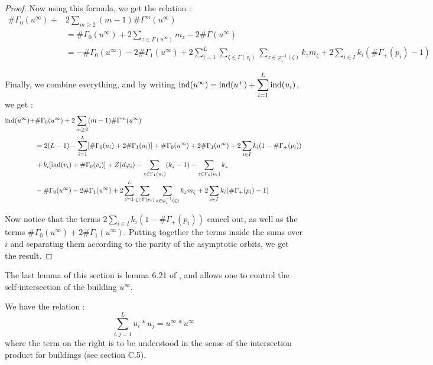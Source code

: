 \documentclass[../main.tex]{subfiles}
\begin{document}
\begin{proof}
Now using this formula, we get the relation : 
\begin{align*}
\#\Gamma_0(u^\infty) + &2\sum_{m\geq 2}(m-1)\#\Gamma^m(u^\infty) \\
&= \#\Gamma_0(u^\infty) + 2\sum_{z\in\Gamma(u^\infty)}m_z - 2\#\Gamma(u^\infty)\\
&=-\#\Gamma_0(u^\infty) - 2\#\Gamma_1(u^\infty) + 2\sum_{i = 1}^L\sum_{\zeta\in\Gamma(v_i)}\sum_{z\in\varphi_i^{-1}(\zeta)}k_z m_{\zeta} + 2\sum_{i \in I}k_i(\#\Gamma_+(p_i)-1)
\end{align*}

Finally, we combine everything, and by writing $\text{ind}(u^\infty) = \text{ind}(u^+) + \displaystyle\sum_{i = 1}^L\text{ind}(u_i)$, we get : 
\begin{align*}
\text{ind}(u^\infty) + &\#\Gamma_0(u^\infty) + 2\sum_{m\geq 2}(m-1)\#\Gamma^m(u^\infty)\\
&= 2(L-1) - \sum_{i = 1}^L[\#\Gamma_0(u_i) + 2 \#\Gamma_1(u_i)] + \#\Gamma_0(u^\infty) + 2\#\Gamma_1(u^\infty) + 2\sum_{i\in I}k_i(1-\#\Gamma_+(p_i))\\  
&+ k_i[\text{ind}(v_i)+\#\Gamma_0(v_i)] + Z(d\varphi_i) - \sum_{z\in\Gamma_1(u_i)}(k_z - 1) - \sum_{z\in\Gamma_0(u_i)}k_z\\
&-\#\Gamma_0(u^\infty) - 2\#\Gamma_1(u^\infty) + 2\sum_{i = 1}^L\sum_{\zeta\in\Gamma(v_i)}\sum_{z\in\varphi_i^{-1}(\zeta)}k_z m_{\zeta} + 2\sum_{i \in I}k_i(\#\Gamma_+(p_i)-1)\\
\end{align*}

Now notice that the terms $2\displaystyle\sum_{i \in I}k_i(1 - \#\Gamma_+(p_i))$ cancel out, as well as the terms $\#\Gamma_0(u^\infty) + 2\#\Gamma_1(u^\infty)$. Putting together the terms inside the sums over $i$ and separating them according to the parity of the asymptotic orbits, we get the result.


\end{proof}


The last lemma of this section is lemma 6.21 of \cite{SOBD2}, and allows one to control the self-intersection of the building $u^\infty$.

\begin{lemma}
We have the relation :
$$\sum_{i,j = 1}^{L}u_i*u_j = u^\infty*u^\infty$$
where the term on the right is to be understood in the sense of the intersection product for buildings (see \cite{wendl_contact_2019} section C.5).
\end{lemma}
\end{document}
